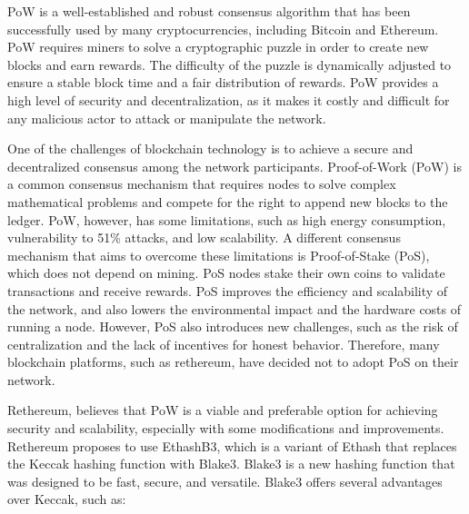 \documentclass[a4paper,onecolumn, superscriptaddress,10pt,accepted=2020-05-01,issue=1, volume=2, shorttitle=papers]{compositionalityarticle}
\begin{document}
PoW is a well-established and robust consensus algorithm that has been successfully used by many cryptocurrencies, including Bitcoin and Ethereum. PoW requires miners to solve a cryptographic puzzle in order to create new blocks and earn rewards. The difficulty of the puzzle is dynamically adjusted to ensure a stable block time and a fair distribution of rewards. PoW provides a high level of security and decentralization, as it makes it costly and difficult for any malicious actor to attack or manipulate the network.

\vspace{0.3cm}

One of the challenges of blockchain technology is to achieve a secure and decentralized consensus among the network participants. Proof-of-Work (PoW) is a common consensus mechanism that requires nodes to solve complex mathematical problems and compete for the right to append new blocks to the ledger. PoW, however, has some limitations, such as high energy consumption, vulnerability to 51\% attacks, and low scalability. A different consensus mechanism that aims to overcome these limitations is Proof-of-Stake (PoS), which does not depend on mining. PoS nodes stake their own coins to validate transactions and receive rewards. PoS improves the efficiency and scalability of the network, and also lowers the environmental impact and the hardware costs of running a node. However, PoS also introduces new challenges, such as the risk of centralization and the lack of incentives for honest behavior. Therefore, many blockchain platforms, such as rethereum, have decided not to adopt PoS on their network.

\vspace{0.3cm}

Rethereum, believes that PoW is a viable and preferable option for achieving security and scalability, especially with some modifications and improvements. Rethereum proposes to use EthashB3, which is a variant of Ethash that replaces the Keccak hashing function with Blake3. Blake3 is a new hashing function that was designed to be fast, secure, and versatile. Blake3 offers several advantages over Keccak, such as:

\vspace{0.3cm}
\end{document}
